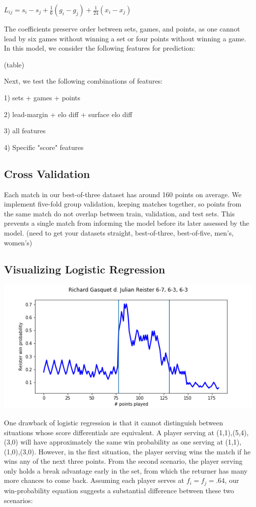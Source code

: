 \documentclass[chapterprefix=false]{report}
\begin{document}
$L_{ij} = s_i-s_j + \frac{1}{6}(g_i-g_j) + \frac{1}{24}(x_i-x_j)$

The coefficients preserve order between sets, games, and points, as one cannot lead by six games without winning a set or four points without winning a game. In this model, we consider the following features for prediction:

(table)

Next, we test the following combinations of features:

1) sets + games + points

2) lead-margin + elo diff + surface elo diff

3) all features

4) Specific "score" features

\subsection{Cross Validation}

Each match in our best-of-three dataset has around 160 points on average. We implement five-fold group validation, keeping matches together, so points from the same match do not overlap between train, validation, and test sets. This prevents a single match from informing the model before its later assessed by the model. (need to get your datasets straight, best-of-three, best-of-five, men's, women's)

\subsection{Visualizing Logistic Regression}

\includegraphics[scale=.7]{gasquet_reister_9_6_all_features}

One drawback of logistic regression is that it cannot distinguish between situations whose score differentials are equivalent. A player serving at (1,1),(5,4),(3,0) will have approximately the same win probability as one serving at (1,1),(1,0),(3,0). However, in the first situation, the player serving wins the match if he wins any of the next three points. From the second scenario, the player serving only holds a break advantage early in the set, from which the returner has many more chances to come back. Assuming each player serves at $f_i=f_j=.64$, our win-probability equation suggests a substantial difference between these two scenarios:
\end{document}
